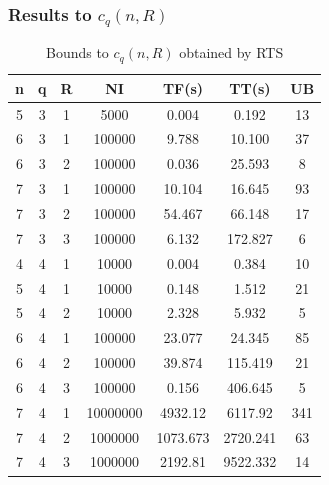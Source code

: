 \documentclass{beamer}
\begin{document}
\begin{frame}
  \frametitle{Results to $c_{q}(n,R)$}
{
\scriptsize

\begin{table}[h]
\label{shortresult}
\begin{center}
\begin{tabular}{|c|c|c|c|c|c|c|}
\hline
n & q & R & NI & TF(s) & TT(s) & UB \\ \hline
5 & 3 & 1 & 5000 & 0.004 & 0.192 & 13 \\ \hline
6 & 3 & 1 & 100000 & 9.788 & 10.100 & 37  \\ \hline
6 & 3 & 2 & 100000 & 0.036 & 25.593 & 8  \\ \hline
7 & 3 & 1 & 100000 & 10.104 & 16.645 & 93  \\ \hline
7 & 3 & 2 & 100000 & 54.467 & 66.148 & 17  \\ \hline
7 & 3 & 3 & 100000 & 6.132 & 172.827 & 6  \\ \hline
4 & 4 & 1 & 10000 & 0.004 & 0.384 & 10  \\ \hline
5 & 4 & 1 & 10000 & 0.148 & 1.512 & 21  \\ \hline
5 & 4 & 2 & 10000 & 2.328 & 5.932 & 5  \\ \hline
6 & 4 & 1 & 100000 & 23.077 & 24.345 & 85  \\ \hline
6 & 4 & 2 & 100000 & 39.874 & 115.419 & 21  \\ \hline
6 & 4 & 3 & 100000 & 0.156 & 406.645 & 5  \\ \hline
7 & 4 & 1 & 10000000 & 4932.12 & 6117.92 & 341  \\ \hline
7 & 4 & 2 & 1000000 & 1073.673 & 2720.241 & 63  \\ \hline
7 & 4 & 3 & 1000000 & 2192.81 & 9522.332 & 14  \\ \hline
\end{tabular}
\caption{Bounds to $c_{q}(n,R)$ obtained by RTS}
\end{center}
\end{table}
}
\end{frame}
\end{document}
